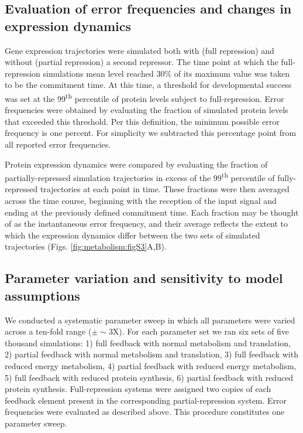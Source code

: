 \subsection{Evaluation of error frequencies and changes in expression dynamics}
\label{appendix:supp:metabolism:model:scoring}

Gene expression trajectories were simulated both with (full repression) and without (partial repression) a second repressor. The time point at which the full-repression simulations mean level reached 30\% of its maximum value was taken to be the commitment time. At this time, a threshold for developmental success was set at the 99\textsuperscript{th} percentile of protein levels subject to full-repression. Error frequencies were obtained by evaluating the fraction of simulated protein levels that exceeded this threshold. Per this definition, the minimum possible error frequency is one percent. For simplicity we subtracted this percentage point from all reported error frequencies.

Protein expression dynamics were compared by evaluating the fraction of partially-repressed simulation trajectories in excess of the 99\textsuperscript{th} percentile of fully-repressed trajectories at each point in time. These fractions were then averaged across the time course, beginning with the reception of the input signal and ending at the previously defined commitment time. Each fraction may be thought of as the instantaneous error frequency, and their average reflects the extent to which the expression dynamics differ between the two sets of simulated trajectories (Figs. \ref{fig:metabolism:figS3}A,B).

\subsection{Parameter variation and sensitivity to model assumptions}
\label{appendix:supp:metabolism:model:sweeps}

We conducted a systematic parameter sweep in which all parameters were varied across a ten-fold range ($\pm \sim$3X). For each parameter set we ran six sets of five thousand simulations: 1) full feedback with normal metabolism and translation, 2) partial feedback with normal metabolism and translation, 3) full feedback with reduced energy metabolism, 4) partial feedback with reduced energy metabolism, 5) full feedback with reduced protein synthesis, 6) partial feedback with reduced protein synthesis. Full-repression systems were assigned two copies of each feedback element present in the corresponding partial-repression system. Error frequencies were evaluated as described above. This procedure constitutes one parameter sweep.

